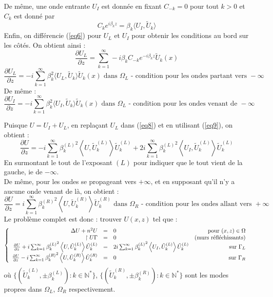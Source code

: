 \documentclass{article}
\begin{document}
De même, une onde entrante $U_I$ est donnée en fixant $C_{-k}=0$ pour tout $k>0$ et $C_k$ est donné par \[C_ke^{i\beta_k z}=\beta_k\langle U_I,\tilde{U}_k\rangle\]
Enfin, on différencie (\ref{eq6}) pour $U_L$ et $U_I$ pour obtenir les conditions au bord sur les côtés. On obtient ainsi :
\[\frac{\partial U_L}{\partial z} =\sum_{k=1}^\infty -i \beta_k C_{-k} e^{-i\beta_k z} \tilde{U}_k(x)\]
\begin{equation} \label{eq8} 
\frac{\partial U_L}{\partial z}= -i \sum_{k=1}^\infty \beta_k^2 \langle U_L,\tilde{U}_k\rangle \tilde{U}_k(x) \text{ dans }\Omega_L\text{ - condition pour les ondes partant vers }-\infty
\end{equation}
De même : 
\begin{equation} \label{eq9} 
\frac{\partial U_I}{\partial z}= -i \sum_{k=1}^\infty \beta_k^2 \langle U_I,\tilde{U}_k\rangle \tilde{U}_k(x) \text{ dans }\Omega_L\text{ - condition pour les ondes venant de }-\infty
\end{equation}

Puisque $U=U_I+U_L$, en replaçant $U_L$ dans (\ref{eq8}) et en utilisant (\ref{eq9}), on obtient : 
	\[\frac{\partial U}{\partial z}=-i\sum_{k=1}^\infty {\beta_k^{(L)}}^2\left\langle U,\tilde{U}^{(L)}_k\right\rangle \tilde{U}^{(L)}_k + 2i\sum_{k=1}^\infty {\beta_k^{(L)}}^2 \left\langle U_I,\tilde{U}_k^{(L)}\right\rangle\tilde{U}^{(L)}_k \]
En surmontant le tout de l'exposant $(L)$ pour indiquer que le tout vient de la gauche, ie de $-\infty$.\\
De même, pour les ondes se propageant vers $+\infty$, et en supposant qu'il n'y a aucune onde venant de là, on obtient :
\[\frac{\partial U}{\partial z}=i\sum_{k=1}^\infty {\beta_k^{(R)}}^2 \left\langle U,\tilde{U}_k^{(R)} \right\rangle \tilde{U}_k^{(R)} \text{ dans } \Omega_R \text{ - condition pour les ondes allant vers }+\infty\]
Le problème complet est donc : trouver $U(x,z)$ tel que : 
\begin{equation} \label{eq10}
\left\{\begin{array}{r c l r}
	\Delta U + n^2U&=&0 &\text{pour } (x,z)\in\Omega\\
	\restriction{U}{\Gamma}&=&0 &\text{(murs réfléchissants)}\\
	\frac{\partial U}{\partial z}+i\sum_{k=1}^\infty {\beta_k^{(L)}}^2\left\langle U,\tilde{U}^{(L)}_k\right\rangle \tilde{U}^{(L)}_k &=& 2i\sum_{k=1}^\infty {\beta_k^{(L)}}^2 \left\langle U_I,\tilde{U}_k^{(L)}\right\rangle\tilde{U}^{(L)}_k &\text{sur }\Gamma_L\\
	\frac{\partial U}{\partial z}-i\sum_{k=1}^\infty {\beta_k^{(R)}}^2 \left\langle U,\tilde{U}_k^{(R)} \right\rangle \tilde{U}_k^{(R)}&=&0 &\text{sur } \Gamma_R
\end{array}\right.
\end{equation}
où $\{(\tilde{U}_k^{(L)},\pm\beta_k^{(L)}):k\in\mathbb{N}^*\}$, $\{(\tilde{U}_k^{(R)},\pm\beta_k^{(R)}):k\in\mathbb{N}^*\}$ sont les modes propres dans $\Omega_L$, $\Omega_R$ respectivement.
\end{document}
